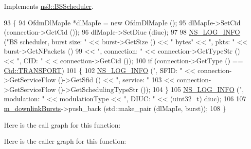 Implements \hyperlink{classns3_1_1BSScheduler_aa36179c8d9bcfcbd4de08bdccb6e904d}{ns3\+::\+B\+S\+Scheduler}.


\begin{DoxyCode}
93 \{
94   OfdmDlMapIe *dlMapIe = \textcolor{keyword}{new} OfdmDlMapIe ();
95   dlMapIe->SetCid (connection->GetCid ());
96   dlMapIe->SetDiuc (diuc);
97 
98   \hyperlink{group__logging_gafbd73ee2cf9f26b319f49086d8e860fb}{NS\_LOG\_INFO} (\textcolor{stringliteral}{"BS scheduler, burst size: "} << burst->GetSize () << \textcolor{stringliteral}{" bytes"} << \textcolor{stringliteral}{", pkts: "} << 
      burst->GetNPackets ()
99                                             << \textcolor{stringliteral}{", connection: "} << connection->GetTypeStr () << \textcolor{stringliteral}{", CID: "} <
      < connection->GetCid ());
100   \textcolor{keywordflow}{if} (connection->GetType () == \hyperlink{classns3_1_1Cid_a10b8f92080ca5790e65a0bfa2f557e0aa46fbed56841c3bf471aa84de022edf87}{Cid::TRANSPORT})
101     \{
102       \hyperlink{group__logging_gafbd73ee2cf9f26b319f49086d8e860fb}{NS\_LOG\_INFO} (\textcolor{stringliteral}{", SFID: "} << connection->GetServiceFlow ()->GetSfid () << \textcolor{stringliteral}{", service: "}
103                               << connection->GetServiceFlow ()->GetSchedulingTypeStr ());
104     \}
105   \hyperlink{group__logging_gafbd73ee2cf9f26b319f49086d8e860fb}{NS\_LOG\_INFO} (\textcolor{stringliteral}{", modulation: "} << modulationType << \textcolor{stringliteral}{", DIUC: "} << (uint32\_t) diuc);
106 
107   \hyperlink{classns3_1_1BSSchedulerSimple_a58431b0c06b4ae64220253afffdbfe06}{m\_downlinkBursts}->push\_back (std::make\_pair (dlMapIe, burst));
108 \}
\end{DoxyCode}


Here is the call graph for this function\+:




Here is the caller graph for this function\+:


